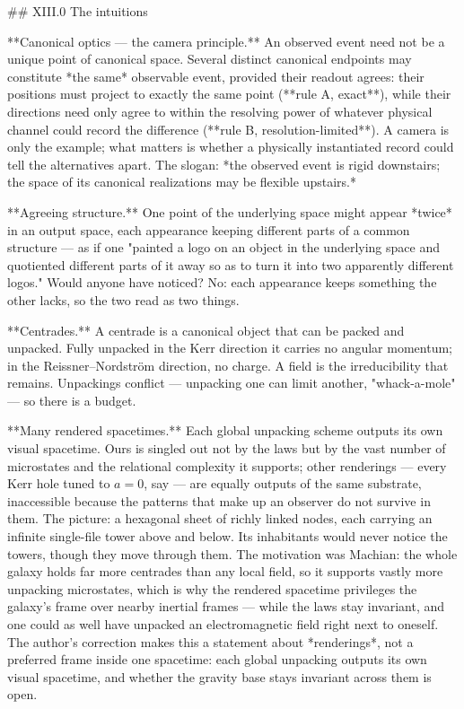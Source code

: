 ## XIII.0 The intuitions

**Canonical optics — the camera principle.** An observed event need not be a unique point of canonical space. Several distinct canonical endpoints may constitute *the same* observable event, provided their readout agrees: their positions must project to exactly the same point (**rule A, exact**), while their directions need only agree to within the resolving power of whatever physical channel could record the difference (**rule B, resolution-limited**). A camera is only the example; what matters is whether a physically instantiated record could tell the alternatives apart. The slogan: *the observed event is rigid downstairs; the space of its canonical realizations may be flexible upstairs.*

**Agreeing structure.** One point of the underlying space might appear *twice* in an output space, each appearance keeping different parts of a common structure — as if one "painted a logo on an object in the underlying space and quotiented different parts of it away so as to turn it into two apparently different logos." Would anyone have noticed? No: each appearance keeps something the other lacks, so the two read as two things.

**Centrades.** A centrade is a canonical object that can be packed and unpacked. Fully unpacked in the Kerr direction it carries no angular momentum; in the Reissner–Nordström direction, no charge. A field is the irreducibility that remains. Unpackings conflict — unpacking one can limit another, "whack-a-mole" — so there is a budget.

**Many rendered spacetimes.** Each global unpacking scheme outputs its own visual spacetime. Ours is singled out not by the laws but by the vast number of microstates and the relational complexity it supports; other renderings — every Kerr hole tuned to $a = 0$, say — are equally outputs of the same substrate, inaccessible because the patterns that make up an observer do not survive in them. The picture: a hexagonal sheet of richly linked nodes, each carrying an infinite single-file tower above and below. Its inhabitants would never notice the towers, though they move through them. The motivation was Machian: the whole galaxy holds far more centrades than any local field, so it supports vastly more unpacking microstates, which is why the rendered spacetime privileges the galaxy's frame over nearby inertial frames — while the laws stay invariant, and one could as well have unpacked an electromagnetic field right next to oneself. The author's correction makes this a statement about *renderings*, not a preferred frame inside one spacetime: each global unpacking outputs its own visual spacetime, and whether the gravity base stays invariant across them is open.

